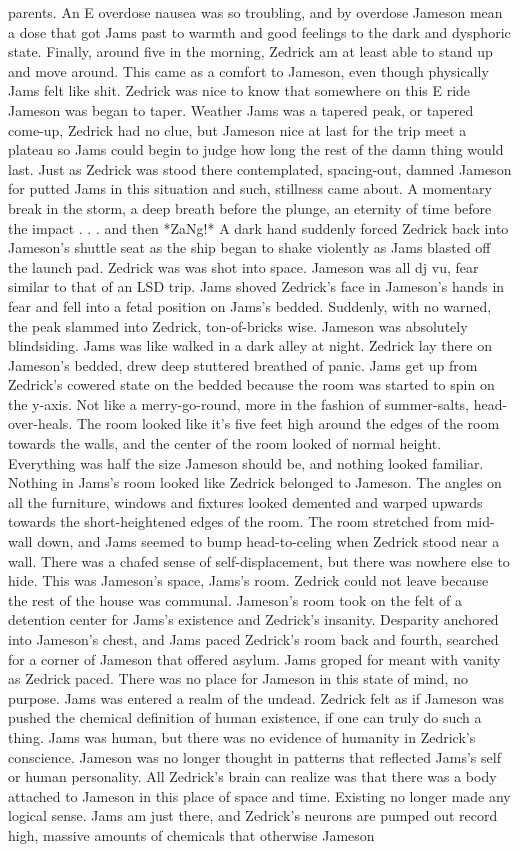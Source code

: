 \documentclass[12pt]{book}
\begin{document}
parents. An E overdose nausea was so troubling, and by overdose Jameson mean a dose that got Jams past to warmth and good feelings to the dark and dysphoric state. Finally, around five in the morning, Zedrick am at least able to stand up and move around. This came as a comfort to Jameson, even though physically Jams felt like shit. Zedrick was nice to know that somewhere on this E ride Jameson was began to taper. Weather Jams was a tapered peak, or tapered come-up, Zedrick had no clue, but Jameson nice at last for the trip meet a plateau so Jams could begin to judge how long the rest of the damn thing would last. Just as Zedrick was stood there contemplated, spacing-out, damned Jameson for putted Jams in this situation and such, stillness came about. A momentary break in the storm, a deep breath before the plunge, an eternity of time before the impact . . . and then *ZaNg!* A dark hand suddenly forced Zedrick back into Jameson's shuttle seat as the ship began to shake violently as Jams blasted off the launch pad. Zedrick was was shot into space. Jameson was all dj vu, fear similar to that of an LSD trip. Jams shoved Zedrick's face in Jameson's hands in fear and fell into a fetal position on Jams's bedded. Suddenly, with no warned, the peak slammed into Zedrick, ton-of-bricks wise. Jameson was absolutely blindsiding. Jams was like walked in a dark alley at night. Zedrick lay there on Jameson's bedded, drew deep stuttered breathed of panic. Jams get up from Zedrick's cowered state on the bedded because the room was started to spin on the y-axis. Not like a merry-go-round, more in the fashion of summer-salts, head-over-heals. The room looked like it's five feet high around the edges of the room towards the walls, and the center of the room looked of normal height. Everything was half the size Jameson should be, and nothing looked familiar. Nothing in Jams's room looked like Zedrick belonged to Jameson. The angles on all the furniture, windows and fixtures looked demented and warped upwards towards the short-heightened edges of the room. The room stretched from mid-wall down, and Jams seemed to bump head-to-celing when Zedrick stood near a wall. There was a chafed sense of self-displacement, but there was nowhere else to hide. This was Jameson's space, Jams's room. Zedrick could not leave because the rest of the house was communal. Jameson's room took on the felt of a detention center for Jams's existence and Zedrick's insanity. Desparity anchored into Jameson's chest, and Jams paced Zedrick's room back and fourth, searched for a corner of Jameson that offered asylum. Jams groped for meant with vanity as Zedrick paced. There was no place for Jameson in this state of mind, no purpose. Jams was entered a realm of the undead. Zedrick felt as if Jameson was pushed the chemical definition of human existence, if one can truly do such a thing. Jams was human, but there was no evidence of humanity in Zedrick's conscience. Jameson was no longer thought in patterns that reflected Jams's self or human personality. All Zedrick's brain can realize was that there was a body attached to Jameson in this place of space and time. Existing no longer made any logical sense. Jams am just there, and Zedrick's neurons are pumped out record high, massive amounts of chemicals that otherwise Jameson 
\end{document}
